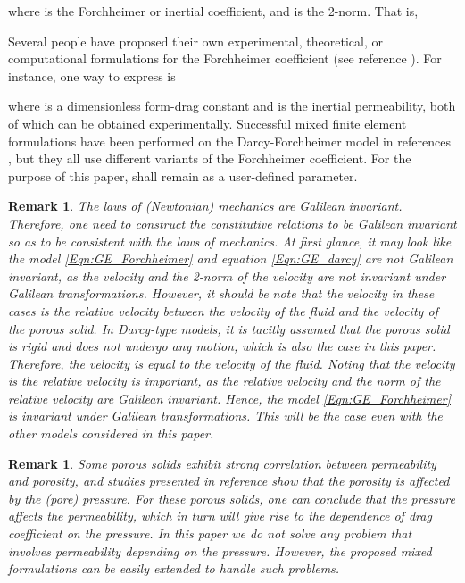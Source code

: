 \documentclass[11pt,reqno]{amsart}
\newtheorem{remark}[theorem]{Remark}
\begin{document}
where  is the Forchheimer 
or inertial coefficient, and  
is the 2-norm. That is, 

Several people have proposed their own experimental, 
theoretical, or computational formulations for the 
Forchheimer coefficient (see reference \cite{W_sobieski}). 
For instance, one way to express  is

where  is a dimensionless form-drag constant 
and  is the inertial permeability, both of which can 
be obtained experimentally. Successful mixed finite element 
formulations have been performed on the Darcy-Forchheimer 
model in references \cite{EJ_Park,Hao_Pan_Forchheimer}, 
but they all use different variants of the Forchheimer 
coefficient. For the purpose of this paper,  
shall remain as a user-defined parameter.

\begin{remark}
  The laws of (Newtonian) mechanics are Galilean 
  invariant. Therefore, one need to construct the 
  constitutive relations to be Galilean invariant 
  so as to be consistent with the laws of mechanics. 
At first glance, it may look like the model 
  \eqref{Eqn:GE_Forchheimer} and equation 
  \eqref{Eqn:GE_darcy} are not Galilean invariant, 
  as the velocity and the 2-norm of the velocity 
  are not invariant under Galilean transformations. 
However, it should be note that the velocity 
   in these cases is 
  the relative velocity between the velocity 
  of the fluid and the velocity of the porous 
  solid. In Darcy-type models, it is tacitly 
  assumed that the porous solid is rigid and 
  does not undergo any motion, which is also 
  the case in this paper. Therefore, the 
  velocity  is 
  equal to the velocity of the fluid. 
Noting that the velocity  
  is the relative velocity is important, as the 
  relative velocity and the norm of the relative 
  velocity are Galilean invariant. Hence, the model 
  \eqref{Eqn:GE_Forchheimer} is invariant under 
  Galilean transformations. This will be the case 
  even with the other models considered in this 
  paper.
\end{remark}

\begin{remark}
  Some porous solids exhibit strong correlation between 
  permeability and porosity, and studies presented in 
  reference \cite{PhysRevA.46.7680} show that the 
  porosity is affected by the (pore) pressure. For 
  these porous solids, one can conclude that the 
  pressure affects the permeability, which in turn 
  will give rise to the dependence of drag coefficient 
  on the pressure. In this paper we do not solve any 
  problem that involves permeability depending on the 
  pressure. However, the proposed mixed formulations 
  can be easily extended to handle such problems. 
\end{remark}
\end{document}
